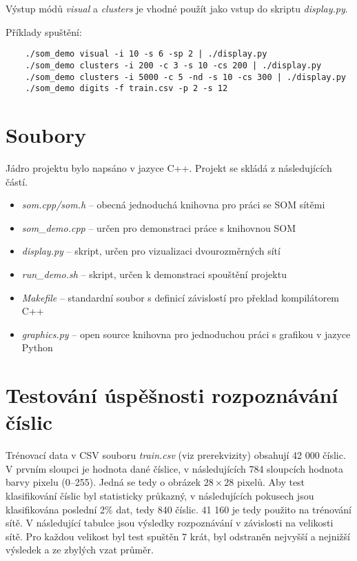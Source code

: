 \documentclass[11pt]{article}
\begin{document}
Výstup módů \textit{visual} a \textit{clusters} je vhodné použít jako vstup do skriptu \textit{display.py}.

Příklady spuštění:
\begin{commandline}
	\begin{verbatim}
	./som_demo visual -i 10 -s 6 -sp 2 | ./display.py
	./som_demo clusters -i 200 -c 3 -s 10 -cs 200 | ./display.py
	./som_demo clusters -i 5000 -c 5 -nd -s 10 -cs 300 | ./display.py 
	./som_demo digits -f train.csv -p 2 -s 12
	\end{verbatim}
\end{commandline}

\section*{Soubory}
Jádro projektu bylo napsáno v jazyce C++. Projekt se skládá z následujících částí. 

\begin{itemize}
	\item \textit{som.cpp/som.h} -- obecná jednoduchá knihovna pro práci se SOM sítěmi
    \item \textit{som\_demo.cpp} -- určen pro demonstraci práce s knihovnou SOM
    \item \textit{display.py} -- skript, určen pro vizualizaci dvourozměrných sítí
    \item \textit{run\_demo.sh} -- skript, určen k demonstraci spouštění projektu
    \item \textit{Makefile} -- standardní soubor s definicí závislostí pro překlad kompilátorem C++ 
    \item \textit{graphics.py} -- open source knihovna pro jednoduchou práci s grafikou v jazyce Python
\end{itemize}
	
\section*{Testování úspěšnosti rozpoznávání číslic}

Trénovací data v CSV souboru \textit{train.csv} (viz prerekvizity) obsahují 42 000 číslic. V prvním sloupci je hodnota dané číslice, v následujících 784 sloupcích hodnota barvy pixelu (0--255). Jedná se tedy o obrázek $28\times28$ pixelů. Aby test klasifikování číslic byl statisticky průkazný, v následujících pokusech jsou klasifikována poslední 2\% dat, tedy 840 číslic. 41 160 je tedy použito na trénování sítě. V následující tabulce jsou výsledky rozpoznávání v závislosti na velikosti sítě. Pro každou velikost byl test spuštěn 7 krát, byl odstraněn nejvyšší a nejnižší výsledek a ze zbylých vzat průměr.
\end{document}
